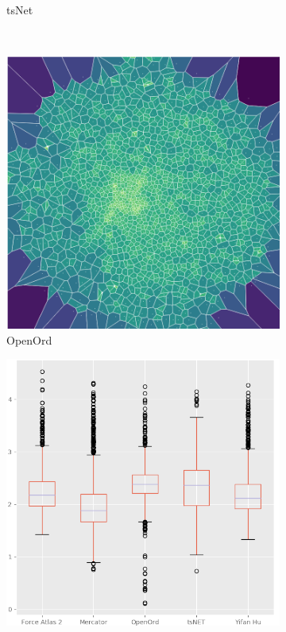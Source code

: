 \begin{figure}[H]
\begin{subfigure}[b]{.49\textwidth}
         \caption{tsNet}
         \label{fig:ats}
     \end{subfigure}\\
    \begin{subfigure}[b]{.49\textwidth}
         \centering \includegraphics[width=\textwidth,angle=-180]{figures_c1/area/fill_oo_aphh.png}
         \caption{OpenOrd}
         \label{fig:aoo}
     \end{subfigure}
         \begin{subfigure}[b]{.49\textwidth}
         \centering \includegraphics[width=\textwidth]{figures_c1/area/log10layoutbox.png}

\end{subfigure}
\end{figure}
